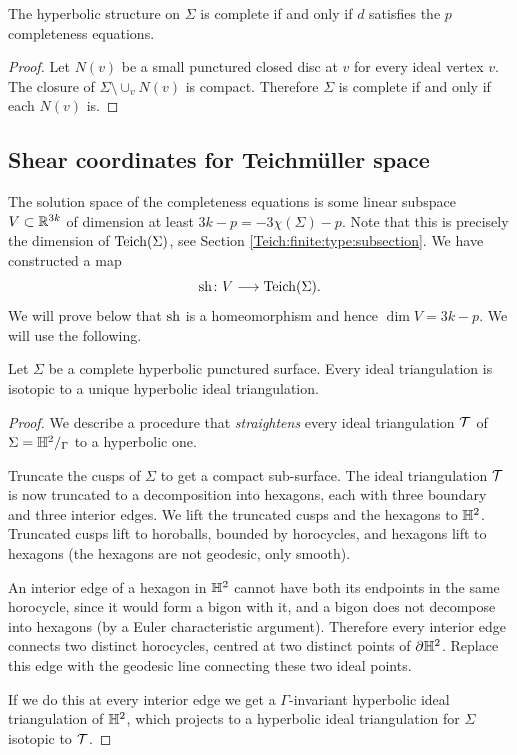 \begin{cor}
The hyperbolic structure on $\Sigma$ is complete if and only if $d$ satisfies the $p$ completeness equations.
\end{cor}
\begin{proof}
Let $N(v)$ be a small punctured closed disc at $v$ for every ideal vertex $v$. The closure of $\Sigma \setminus \cup_v N(v)$ is compact. Therefore $\Sigma$ is complete if and only if each $N(v)$ is.
\end{proof} 

\subsection{Shear coordinates for Teichm\"uller space}
The solution space of the completeness equations is some linear subspace $V \subset \mathbb{R}^{3k}$ of dimension at least $3k-p = -3\chi(\Sigma)-p$. Note that this is precisely the dimension of ${\rm Teich}(\Sigma)$, see Section \ref{Teich:finite:type:subsection}. We have constructed a map
$${\rm sh}\colon V \longrightarrow {\rm Teich}(\Sigma).$$
We will prove below that ${\rm sh}$ is a homeomorphism and hence $\dim V = 3k-p$. We will use the following.

\begin{prop} \label{straightens:prop}
Let $\Sigma$ be a complete hyperbolic punctured surface.
Every ideal triangulation is isotopic to a unique hyperbolic ideal triangulation. 
\end{prop}
\begin{proof}
We describe a procedure that \emph{straightens} every ideal triangulation $\mathcal{T}$ of $\Sigma = \mathbb{H}^2/_\Gamma$ to a hyperbolic one. 

Truncate the cusps of $\Sigma$ to get a compact sub-surface. The ideal triangulation $\mathcal{T}$ is now truncated to a decomposition into hexagons, each with three boundary and three interior edges. We lift the truncated cusps and the hexagons to $\mathbb{H}^2$. Truncated cusps lift to horoballs, bounded by horocycles, and hexagons lift to hexagons (the hexagons are not geodesic, only smooth). 

An interior edge of a hexagon in $\mathbb{H}^2$ cannot have both its endpoints in the same horocycle, since it would form a bigon with it, and a bigon does not decompose into hexagons (by a Euler characteristic argument). Therefore every interior edge connects two distinct horocycles, centred at two distinct points of $\partial \mathbb{H}^2$. Replace this edge with the geodesic line connecting these two ideal points.

If we do this at every interior edge we get a $\Gamma$-invariant hyperbolic ideal triangulation of $\mathbb{H}^2$, which projects to a hyperbolic ideal triangulation for $\Sigma$ isotopic to $\mathcal{T}$.  
\end{proof}

